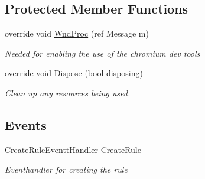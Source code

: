 \subsection*{Protected Member Functions}
\begin{DoxyCompactItemize}
\item 
override void \hyperlink{class_web_analyzer_1_1_u_i_1_1_edit_rule_form_a17f361a8d574576a1c2753b6cf70ca52}{Wnd\+Proc} (ref Message m)
\begin{DoxyCompactList}\small\item\em Needed for enabling the use of the chromium dev tools \end{DoxyCompactList}\item 
override void \hyperlink{class_web_analyzer_1_1_u_i_1_1_edit_rule_form_ab1eaea9ca9d285938a31d96a5ada8a6a}{Dispose} (bool disposing)
\begin{DoxyCompactList}\small\item\em Clean up any resources being used. \end{DoxyCompactList}\end{DoxyCompactItemize}
\subsection*{Events}
\begin{DoxyCompactItemize}
\item 
Create\+Rule\+Eventt\+Handler \hyperlink{class_web_analyzer_1_1_u_i_1_1_edit_rule_form_a270cf87236a05ce56741d8df75a16a0c}{Create\+Rule}
\begin{DoxyCompactList}\small\item\em Eventhandler for creating the rule \end{DoxyCompactList}\end{DoxyCompactItemize}
